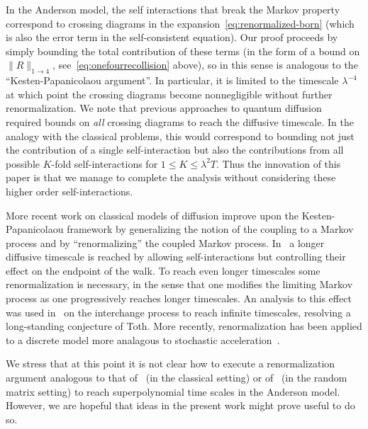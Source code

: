 \documentclass[11pt]{amsart}
\numberwithin{equation}{section}
\numberwithin{theorem}{section}
\begin{document}
In the Anderson model, the self interactions that break the Markov property correspond to crossing diagrams
in the expansion~\eqref{eq:renormalized-born} (which is also the error term in the self-consistent equation).  Our proof proceeds by simply bounding the total contribution of these terms (in the form of a bound on $\|R\|_{1\to 4}$, see~\eqref{eq:onefourrecollision} above), so in this sense is analogous to the ``Kesten-Papanicolaou argument''. In particular, it is limited to the timescale $\lambda^{-4}$ at which
point the crossing diagrams become nonnegligible without further renormalization.  We note that previous approaches to quantum diffusion~\cite{ESYRSE, ESYAnderson,hernandez2024quantum} required bounds on \textit{all} crossing diagrams to reach the diffusive timescale.  In the analogy with the classical problems, this would correspond to bounding not just the contribution of a single self-interaction but also the contributions from all possible $K$-fold self-interactions for $1\leq K\leq \lambda^2T$.   Thus the innovation of this paper is that we manage to complete the analysis without considering these higher order self-interactions.

More recent work on classical models of diffusion improve upon the Kesten-Papanicolaou framework by generalizing the notion of the coupling to a Markov process and by ``renormalizing'' the coupled Markov process.  In~\cite{lutsko2020invariance} a longer diffusive timescale is reached by allowing self-interactions but controlling their effect on the endpoint of the walk.  To reach even longer timescales some renormalization is necessary, in the sense that one modifies the limiting Markov process as one progressively reaches longer timescales.  An analysis to this effect was used in~\cite{elboim2022infinite} on the interchange process to reach infinite timescales, resolving a long-standing conjecture of Toth.    More recently, renormalization has been applied to a discrete model more analagous
to stochastic acceleration~\cite{elboim2025lorentz}.

We stress that at this point it is not clear how to execute a renormalization argument analogous to that of~\cite{elboim2022infinite,elboim2025lorentz} (in the classical setting) or of~\cite{yang2021delocalization,yang2021random,yang2021delocalization,dubova2025delocalization} (in the random matrix setting) to reach superpolynomial time scales in the Anderson model.  However, we are
hopeful that ideas in the present work might prove useful to do so.
\end{document}
